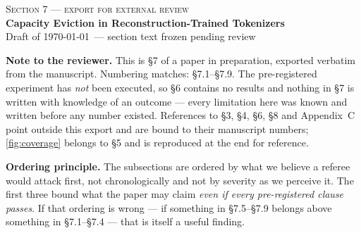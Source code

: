 \documentclass[10pt]{article}
\author{}
\date{}
\begin{document}
\makeatletter
{}
\makeatother

\setcounter{section}{6}   %
\setcounter{figure}{6}    %
\setcounter{table}{0}

{\centering
{\normalsize\textsc{Section 7 --- export for external review}}\\[0.5em]
{\Large\bfseries Capacity Eviction in Reconstruction-Trained Tokenizers}\\[0.4em]
{\small\color{tolgrey} Draft of \today\ --- section text frozen pending review}\\[1.6em]
}

\noindent\textbf{Note to the reviewer.} This is \S7 of a paper in preparation, exported verbatim
from the manuscript. Numbering matches: \S7.1--\S7.9. The pre-registered experiment has \emph{not}
been executed, so \S6 contains no results and nothing in \S7 is written with knowledge of an
outcome --- every limitation here was known and written before any number existed. References to
\S3, \S4, \S6, \S8 and Appendix~C point outside this export and are bound to their manuscript
numbers; \cref{fig:coverage} belongs to \S5 and is reproduced at the end for reference.

\medskip
\noindent\textbf{Ordering principle.} The subsections are ordered by what we believe a referee
would attack first, not chronologically and not by severity as we perceive it. The first three
bound what the paper may claim \emph{even if every pre-registered clause passes}. If that ordering
is wrong --- if something in \S7.5--\S7.9 belongs above something in \S7.1--\S7.4 --- that is
itself a useful finding.
\end{document}
